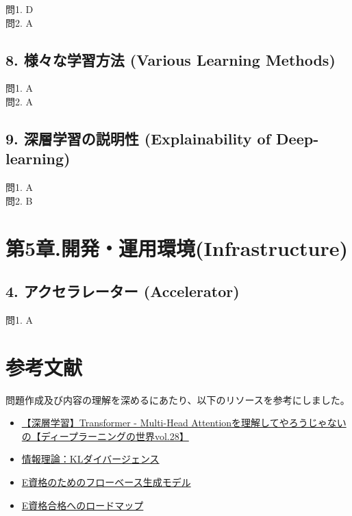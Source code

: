 \documentclass[
  letterpaper,
  DIV=11,
  numbers=noendperiod]{scrreprt}
\providecommand{\tightlist}{%
  \setlength{\itemsep}{0pt}\setlength{\parskip}{0pt}}
\begin{document}
問1. D\\
問2. A

\section{8. 様々な学習方法 (Various Learning
Methods)}\label{ux69d8ux3005ux306aux5b66ux7fd2ux65b9ux6cd5-various-learning-methods-1}

問1. A\\
問2. A

\section{9. 深層学習の説明性 (Explainability of
Deep-learning)}\label{ux6df1ux5c64ux5b66ux7fd2ux306eux8aacux660eux6027-explainability-of-deep-learning-1}

問1. A\\
問2. B


\chapter{第5章.開発・運用環境(Infrastructure)}\label{ux7b2c5ux7ae0.ux958bux767aux904bux7528ux74b0ux5883infrastructure-1}

\section{4. アクセラレーター
(Accelerator)}\label{ux30a2ux30afux30bbux30e9ux30ecux30fcux30bfux30fc-accelerator-1}

問1. A


\chapter{参考文献}\label{ux53c2ux8003ux6587ux732e}

問題作成及び内容の理解を深めるにあたり、以下のリソースを参考にしました。

\begin{itemize}
\tightlist
\item
  \href{https://www.youtube.com/watch?v=50XvMaWhiTY}{【深層学習】Transformer
  - Multi-Head
  Attentionを理解してやろうじゃないの【ディープラーニングの世界vol.28】}
\item
  \href{https://note.com/kikaben/n/n1b8b8fa1a0e6}{情報理論：KLダイバージェンス}
\item
  \href{https://engineernoi.hatenablog.com/entry/2024/05/12/233601}{E資格のためのフローベース生成モデル}
\item
  \href{https://ai4mdx.com/index.html}{E資格合格へのロードマップ}
\end{itemize}
\end{document}
